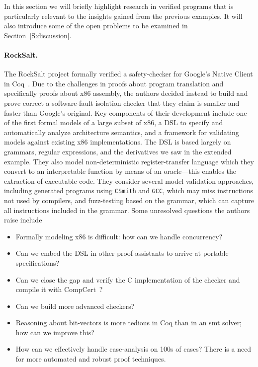 In this section we will briefly highlight research in verified programs that is
particularly relevant to the insights gained from the previous examples. It will
also introduce some of the open problems to be examined in
Section~\ref{S:discussion}.

\paragraph{RockSalt.} The RockSalt project formally verified a safety-checker
for Google's Native Client in Coq~\cite{Morrisett_2012}. Due to the challenges
in proofs about program translation and specifically proofs about x86 assembly,
the authors decided instead to build and prove correct a software-fault
isolation checker that they claim is smaller and faster than Google's original.
Key components of their development include one of the first formal models of a
large subset of x86, a DSL to specify and automatically analyze architecture
semantics, and a framework for validating models against existing x86
implementations. The DSL is based largely on grammars, regular expressions, and
the derivatives we saw in the extended example. They also model
non-deterministic register-transfer language which they convert to an
interpretable function by means of an oracle---this enables the extraction of
executable code. They consider several model-validation approaches, including
generated programs using \texttt{CSmith} and \texttt{GCC}, which may miss
instructions not used by compilers, and fuzz-testing based on the grammar, which
can capture all instructions included in the grammar. Some unresolved questions
the authors raise include
\begin{itemize}
    \item Formally modeling x86 is difficult: how can we handle concurrency?
    \item Can we embed the DSL in other proof-assistants to arrive at portable
        specifications?
    \item Can we close the gap and verify the C implementation of the checker
        and compile it with CompCert~\cite{Leroy-Compcert-CACM}?
    \item Can we build more advanced checkers?
    \item Reasoning about bit-vectors is more tedious in Coq than in an
        \gls{smt} solver; how can we improve this?
    \item How can we effectively handle case-analysis on 100s of cases? There is
        a need for more automated and robust proof techniques.
\end{itemize}


